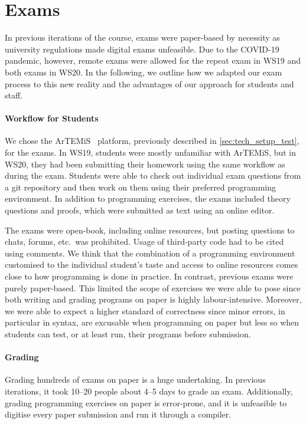 \section{Exams}\label{sec:exam}
In previous iterations of the course, exams were paper-based by necessity as university regulations made digital exams unfeasible.
Due to the COVID-19 pandemic, however, remote exams
were allowed for the repeat exam in WS19 and both exams in WS20.
In the following, we outline how we adapted our exam process to this new reality and the advantages of our approach for students and staff.

\paragraph{Workflow for Students}

We chose the ArTEMiS~\cite{artemis} platform, previously described in \cref{sec:tech_setup_test}, for the exams.
In WS19, students were mostly unfamiliar with ArTEMiS,
but in WS20, they had been submitting their homework using the same workflow as during the exam.
Students were able to check out individual exam questions from a git repository and then work on them using their preferred programming environment.
In addition to programming exercises, the exams included theory questions and proofs, which were submitted as text using an online editor.

The exams were open-book, including online resources,
but posting questions to chats, forums, etc.\ was prohibited.
Usage of third-party code had to be cited using comments.
We think that the combination of a programming environment customised to the individual student's taste and access to online resources comes close to how programming is done in practice.
In contrast, previous exams were purely paper-based.
This limited the scope of exercises we were able to pose
since both writing and grading programs on paper is highly labour-intensive.
Moreover, we were able to expect a higher standard of correctness
since minor errors, in particular in syntax, are excusable when programming on paper but less so when students can test, or at least run, their programs before submission.

\paragraph{Grading}
Grading hundreds of exams on paper is a huge undertaking.
In previous iterations,
it took 10--20 people about 4--5 days to grade an exam.
Additionally, grading programming exercises on paper is error-prone, and it is unfeasible to digitise every paper submission and run it through a compiler.

